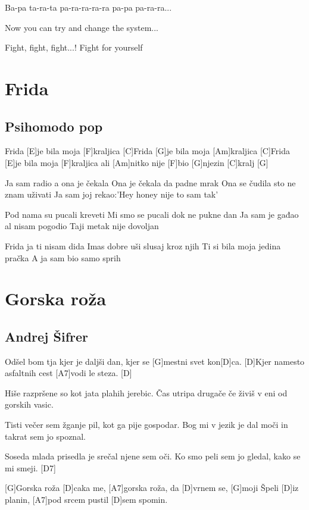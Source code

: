 \documentclass[a4paper,12pt]{article}
\begin{document}
\begin{multicols}{2}
\begin{guitar}
Ba-pa ta-ra-ta pa-ra-ra-ra-ra
pa-pa pa-ra-ra...


Now you can try and change the system...


Fight, fight, fight...!
Fight for yourself

\end{guitar}
\section{Frida}
\subsection*{Psihomodo pop}
\begin{guitar}
[C]Frida [E]je bila moja [F]kraljica
[C]Frida [G]je bila moja [Am]kraljica
[C]Frida [E]je bila moja [F]kraljica
ali [Am]nitko nije [F]bio [G]njezin [C]kralj [G]


Ja sam radio a ona je čekala 
Ona je čekala da padne mrak 
Ona se čudila sto ne znam uživati 
Ja sam joj rekao:'Hey honey nije to sam tak'
 

Pod nama su pucali kreveti 
Mi smo se pucali dok ne pukne dan 
Ja sam je gađao al nisam pogodio 
Taji metak nije dovoljan

 
Frida ja ti nisam dida 
Imas dobre uši slusaj kroz njih 
Ti si bila moja jedina pračka     
A ja sam bio samo sprih

\end{guitar}
\section{Gorska roža}
\subsection*{Andrej Šifrer}
\begin{guitar}
[D]Odšel bom tja kjer je daljši dan,
kjer se [G]mestni svet kon[D]ca.
[D]Kjer namesto asfaltnih cest
[A7]vodi le steza. [D]


Hiše razpršene so
kot jata plahih jerebic.
Čas utripa drugače če živiš
v eni od gorskih vasic.


Tisti večer sem žganje pil,
kot ga pije gospodar.
Bog mi v jezik je dal moči
in takrat sem jo spoznal.


Soseda mlada prisedla je
srečal njene sem oči.
Ko smo peli sem jo gledal,
kako se mi smeji. [D7]

  
[G]Gorska roža [D]caka me,
[A7]gorska roža, da [D]vrnem se,
[G]moji Špeli [D]iz planin,
[A7]pod srcem pustil [D]sem spomin.



\end{guitar}
\end{multicols}
\end{document}
